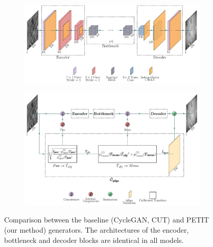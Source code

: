 \def \schematicScale {0.79}
\begin{figure}
  \centering
  \begin{subfigure}{\schematicScale\textwidth}
    \centering\includegraphics[width=\linewidth]{../figs/network/src/cut.pdf}
    \label{fig:backbone_models}
    \vspace{0.0cm}
  \end{subfigure}  
  \begin{subfigure}{\schematicScale\textwidth}
    \centering\includegraphics[width=\linewidth]{../figs/network/src/petit.pdf}
    \label{fig:PETIT_model}
  \end{subfigure}
  \caption{Comparison between the baseline (CycleGAN, CUT) and PETIT (our method) generators. The architectures of the encoder, bottleneck and decoder blocks are identical in all models.}
  \label{fig:arch_comp}
\end{figure}